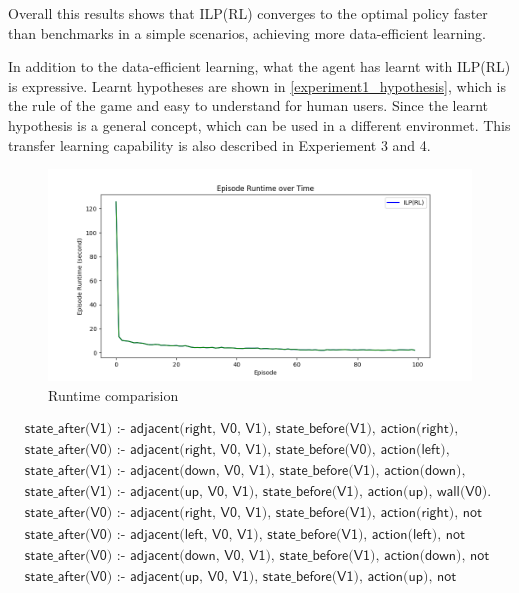Overall this results shows that ILP(RL) converges to the optimal policy faster than benchmarks in a simple scenarios, achieving more data-efficient learning.

In addition to the data-efficient learning, what the agent has learnt with ILP(RL) is expressive.
Learnt hypotheses are shown in \ref{experiment1_hypothesis}, which is the rule of the game and easy to understand for human users.
Since the learnt hypothesis is a general concept, which can be used in a different environmet.
This transfer learning capability is also described in Experiement 3 and 4.

\begin{figure}[!htb]
\centering
\includegraphics[width=1.0\textwidth]{./figures/experiment1_runtime}
\caption{Runtime comparision}
\label{experiment1}
\end{figure}

\begin{equation}\label{experiment1_hypothesis}
\begin{split}
&\textsf{state\_after(V1) :- adjacent(right, V0, V1), state\_before(V1), action(right), wall(V0).}\\
&\textsf{state\_after(V0) :- adjacent(right, V0, V1), state\_before(V0), action(left), wall(V1).}\\
&\textsf{state\_after(V1) :- adjacent(down, V0, V1), state\_before(V1), action(down), wall(V0).}\\
&\textsf{state\_after(V1) :- adjacent(up, V0, V1), state\_before(V1), action(up), wall(V0).}\\
&\textsf{state\_after(V0) :- adjacent(right, V0, V1), state\_before(V1), action(right), not wall(V0).}\\
&\textsf{state\_after(V0) :- adjacent(left, V0, V1), state\_before(V1), action(left), not wall(V0).}\\
&\textsf{state\_after(V0) :- adjacent(down, V0, V1), state\_before(V1), action(down), not wall(V0).}\\
&\textsf{state\_after(V0) :- adjacent(up, V0, V1), state\_before(V1), action(up), not wall(V0).}
\end{split}
\end{equation}

